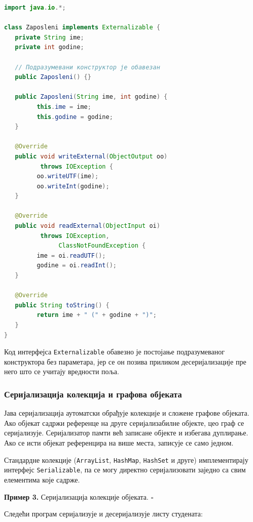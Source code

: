 \begin{lstlisting}[language=Java]
import java.io.*;
 
class Zaposleni implements Externalizable {
   private String ime;
   private int godine;
 
   // Подразумевани конструктор је обавезан
   public Zaposleni() {}
 
   public Zaposleni(String ime, int godine) {
         this.ime = ime;
         this.godine = godine;
   }
 
   @Override
   public void writeExternal(ObjectOutput oo)
          throws IOException {
         oo.writeUTF(ime);
         oo.writeInt(godine);
   }
 
   @Override
   public void readExternal(ObjectInput oi)
          throws IOException,
               ClassNotFoundException {
         ime = oi.readUTF();
         godine = oi.readInt();
   }
 
   @Override
   public String toString() {
         return ime + " (" + godine + ")";
   }
}
\end{lstlisting}


Код интерфејса \texttt{Externalizable} обавезно је постојање подразумеваног конструктора без параметара, јер се он позива приликом десеријализације пре него што се учитају вредности поља.


\subsubsection{Серијализација колекција и графова објеката}

Јава серијализација аутоматски обрађује колекције и сложене графове објеката. Ако објекат садржи референце на друге серијализабилне објекте, цео граф се серијализује. Серијализатор памти већ записане објекте и избегава дуплирање. Ако се исти објекат референцира на више места, записује се само једном.

Стандардне колекције (\texttt{ArrayList}, \texttt{HashMap}, \texttt{HashSet} и друге) имплементирају интерфејс \texttt{Serializable}, па се могу директно серијализовати заједно са свим елементима које садрже.


\bigskip

\noindent \textbf{Пример 3.} Серијализација колекције објеката. $\square$

\medskip

Следећи програм серијализује и десеријализује листу студената:


